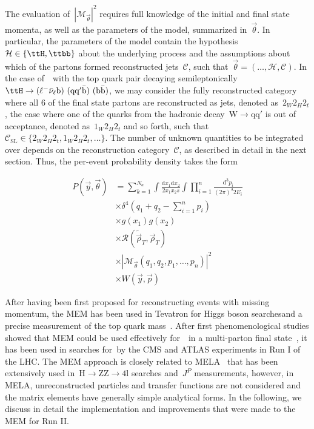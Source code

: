 The evaluation of~$|\mathcal{M}_{\vec{\theta}}|^2$ requires full knowledge of the initial and final state momenta, as well as the parameters of the model, summarized in~$\vec{\theta}$. In particular, the parameters of the model contain the hypothesis~$\mathcal{H} \in \{\ttH, \ttbb\}$ about the underlying process and the assumptions about which of the partons formed reconstructed jets~$\mathcal{C}$, such that~$\vec{\theta} = (\dots, \mathcal{H}, \mathcal{C})$. In the case of~\ttH~with the top quark pair decaying semileptonically~$\ttH \rightarrow (\ell^- \bar{\mathrm{\nu}}_\ell \mathrm{b})\ (\mathrm{q} \mathrm{q}' \bar{\mathrm{b}})\ (\mathrm{b} \bar{\mathrm{b}})$, we may consider the fully reconstructed category where all 6 of the final state partons are reconstructed as jets, denoted as~$2_W 2_H 2_t$, the case where one of the quarks from the hadronic decay~$\mathrm{W} \rightarrow \mathrm{q} \mathrm{q}'$ is out of acceptance, denoted as~$1_W 2_H 2_t$ and so forth, such that~$\mathcal{C}_{\mathrm{SL}} \in \{ 2_W 2_H 2_t, 1_W 2_H 2_t, \dots \}$. The number of unknown quantities to be integrated over depends on the reconstruction category~$\mathcal{C}$, as described in detail in the next section. 
Thus, the per-event probability density takes the form

\begin{align}
\label{eq:mem_definition}
P(\vec{y}, \vec{\theta}) &= \sum_{k=1}^{N_a} \int \frac{\mathrm{d}x_1 \mathrm{d}x_2}{2 x_1 x_2 s} \int \prod_{i=1}^{n} \frac{\mathrm{d}^3 p_i}{(2\pi)^3 2 E_i} \\
&\times \delta^4 (q_1 + q_2 - \sum_{i=1}^n p_i)\\
&\times g(x_1) g(x_2) \\ 
&\times \mathcal{R}(\tilde{\vec{\rho}}_T, \vec{\rho}_T) \\ 
&\times |\mathcal{M}_{\vec{\theta}}(q_1, q_2, p_1, \dots, p_n)|^2 \\
&\times W(\vec{y}, \vec{p})
\end{align}

After having been first proposed for reconstructing events with missing momentum\cite{Kondo1988}, the MEM has been used in Tevatron for Higgs boson searches\fix and a precise measurement of the top quark mass~\cite{D0topmass2004}. After first phenomenological studies showed that MEM could be used effectively for~\ttH~in a multi-parton final state~\cite{Artoisenet2013}, it has been used in searches for~\ttH by the CMS and ATLAS experiments in Run I of the LHC\fix. The MEM approach is closely related to MELA~\cite{Gao} that has been extensively used in~$\mathrm{H} \rightarrow \mathrm{ZZ} \rightarrow 4\mathrm{l}$ searches and~$J^P$ measurements, however, in MELA, unreconstructed particles and transfer functions are not considered and the matrix elements have generally simple analytical forms.
In the following, we discuss in detail the implementation and improvements that were made to the MEM for Run II.

